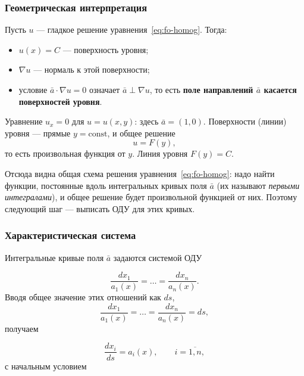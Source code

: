 \subsubsection*{Геометрическая интерпретация}

Пусть $u$ — гладкое решение уравнения~\eqref{eq:fo-homog}. Тогда:

\begin{itemize}[leftmargin=1.6em]
  \item $u(x) = C$ — поверхность уровня;
  \item $\nabla u$ — нормаль к этой поверхности;
  \item условие $\bar a \cdot \nabla u = 0$ означает $\bar a \perp \nabla u$, то
        есть \textbf{поле направлений $\bar a$ касается поверхностей уровня}.
\end{itemize}

\begin{example}
Уравнение $u_x = 0$ для $u = u(x,y)$: здесь $\bar a = (1,0)$. Поверхности
(линии) уровня — прямые $y = \mathrm{const}$, и общее решение
\[
  u = F(y) ,
\]
то есть произвольная функция от $y$. Линия уровня $F(y) = C$.
\end{example}

\begin{idea}
Отсюда видна общая схема решения уравнения~\eqref{eq:fo-homog}: надо найти
функции, постоянные вдоль интегральных кривых поля $\bar a$ (их называют
\emph{первыми интегралами}), и общее решение будет произвольной функцией от
них. Поэтому следующий шаг — выписать ОДУ для этих кривых.
\end{idea}

\subsubsection*{Характеристическая система}

Интегральные кривые поля $\bar a$ задаются системой ОДУ

\begin{equation}\tag{2}\label{eq:char-sys-prop}
  \frac{dx_1}{a_1(x)} = \dots = \frac{dx_n}{a_n(x)} .
\end{equation}
Вводя общее значение этих отношений как $ds$,
\[
  \frac{dx_1}{a_1(x)} = \dots = \frac{dx_n}{a_n(x)} = ds ,
\]
получаем

\begin{equation}\tag{3}\label{eq:char-sys}
  \frac{dx_i}{ds} = a_i(x), \qquad i = \overline{1,n} ,
\end{equation}
с начальным условием


